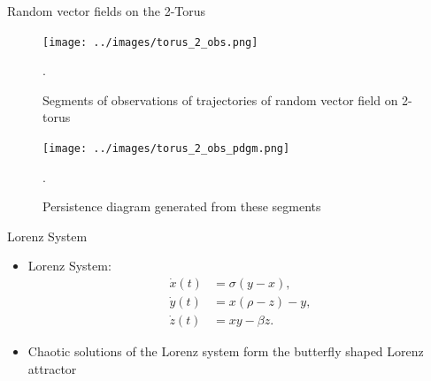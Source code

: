 \documentclass{beamer}
\begin{document}
\begin{frame}{Random vector fields on the 2-Torus}
        \begin{minipage}[b]{0.5\linewidth}
            \begin{figure}
            \texttt{[image: ../images/torus\_2\_obs.png]}
            \caption{Segments of observations of trajectories of random vector field on 2-torus}.
            \end{figure}
        \end{minipage}
        \hspace{0.5cm}
        \pause
        \begin{minipage}[b]{0.4\linewidth}
            \begin{figure}
            \texttt{[image: ../images/torus\_2\_obs\_pdgm.png]}
            \caption{Persistence diagram generated from these segments}.
            \end{figure}
        \end{minipage}
\end{frame}

\begin{frame}{Lorenz System}
    \begin{itemize}
        \item Lorenz System:
            \begin{align*}
                \dot{x}(t) &= \sigma(y-x), \\
                \dot{y}(t) &= x(\rho-z) - y, \\
                \dot{z}(t) &= xy - \beta z.
            \end{align*}
            \pause
        \item Chaotic solutions of the Lorenz system form the butterfly shaped Lorenz attractor
    \end{itemize}
\end{frame}
\end{document}

